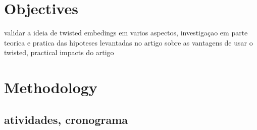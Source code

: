 \documentclass[Ingles]{ic-tese-v3}
\begin{document}
\chapter{Objectives}
\label{sec:orgd5ff7ef}
validar a ideia de twisted embedings em varios aspectos, investigaçao em parte teorica e pratica das hipoteses levantadas no artigo sobre as vantagens de usar o twisted, practical impacts do artigo
\chapter{Methodology}
\label{sec:orgb5ddcb7}
\section{atividades, cronograma}
\label{sec:org1de21e8}


\end{document}
